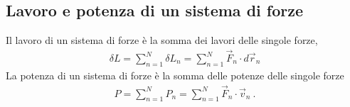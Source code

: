 \documentclass[letterpaper,10pt,italian]{jupyterBook}
\begin{document}
\subsection{Lavoro e potenza di un sistema di forze}
\label{\detokenize{ch/mechanics/actions-work:lavoro-e-potenza-di-un-sistema-di-forze}}
\sphinxAtStartPar
{} Il lavoro di un sistema di forze è la somma dei lavori delle singole forze,
\begin{equation*}
\begin{split}\delta L = \sum_{n=1}^{N} \delta L_n = \sum_{n=1}^{N} \vec{F}_n \cdot d \vec{r}_n\end{split}
\end{equation*}
\sphinxAtStartPar
{} La potenza di un sistema di forze è la somma delle potenze delle singole forze
\begin{equation*}
\begin{split}P = \sum_{n=1}^{N} P_n = \sum_{n=1}^{N} \vec{F}_n \cdot \vec{v}_n \ .\end{split}
\end{equation*}
\end{document}
